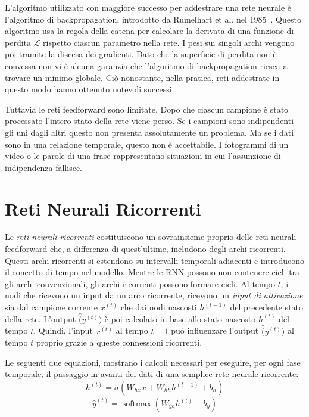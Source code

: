 L'algoritmo utilizzato con maggiore successo per addestrare una rete neurale \`e l'algoritmo di backpropagation, introdotto da Rumelhart et al. nel 1985~\cite{Rumelhart:1985}.
Questo algoritmo usa la regola della catena per calcolare la derivata di una funzione di perdita $\mathcal{L}$ rispetto ciascun parametro nella rete.
I pesi sui singoli archi vengono poi tramite la discesa dei gradienti.
Dato che la superficie di perdita non \`e convessa non vi \`e alcuna garanzia che l'algoritmo di backpropagation riesca a trovare un minimo globale.
Ci\`o nonostante, nella pratica, reti addestrate in questo modo hanno ottenuto notevoli successi.

Tuttavia le reti feedforward sono limitate.
Dopo che ciascun campione \`e stato processato l'intero stato della rete viene perso.
Se i campioni sono indipendenti gli uni dagli altri questo non presenta assolutamente un problema.
Ma se i dati sono in una relazione temporale, questo non \`e accettabile.
I fotogrammi di un video o le parole di una frase rappresentano situazioni in cui l'assunzione di indipendenza fallisce.

\section{Reti Neurali Ricorrenti}
Le \emph{reti neurali ricorrenti} costituiscono un sovrainsieme proprio delle reti neurali feedforward che, a differenza di quest'ultime, includono degli archi ricorrenti.
Questi archi ricorrenti si estendono su intervalli temporali adiacenti e introducono il concetto di tempo nel modello.
Mentre le RNN possono non contenere cicli tra gli archi convenzionali, gli archi ricorrenti possono formare cicli.
Al tempo $t$, i nodi che ricevono un input da un arco ricorrente, ricevono un \emph{input di attivazione} sia dal campione corrente $x^({t})$ che dai nodi nascosti $h^{(t-1)}$ del precedente stato della rete.
L'output $\hat(y^{(t)})$ \`e poi calcolato in base allo stato nascosto $h^{(t)}$ del tempo $t$.
Quindi, l'input $x^({t})$ al tempo $t-1$ pu\`o influenzare l'output $\hat(y^{(t)})$ al tempo $t$ proprio grazie a queste connessioni ricorrenti.

Le seguenti due equazioni, mostrano i calcoli necessari per eseguire, per ogni fase temporale, il passaggio in avanti dei dati di una semplice rete neurale ricorrente:
\begin{equation}
  h^{(t)} = \sigma(W_{hx}x + W_{hh}h^{(t-1)} + b_h)
\end{equation}
\begin{equation}
  \hat{y}^{(t)} = \operatorname{softmax}(W_{yh}h^{(t)} + b_y)
\end{equation}

